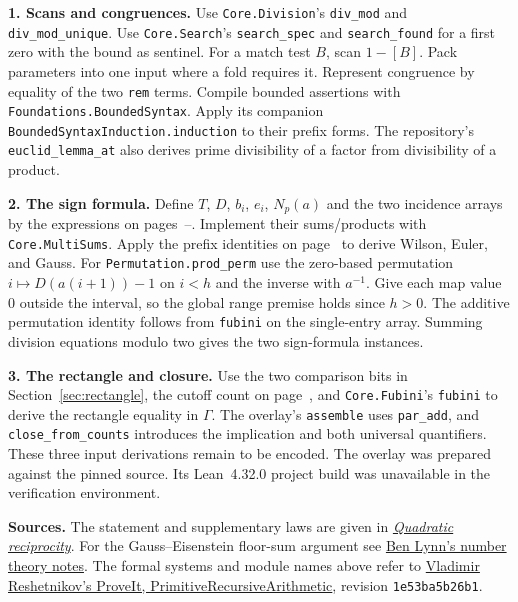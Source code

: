 \documentclass[12pt,letterpaper]{article}
\newcommand{\code}[1]{\texttt{#1}}
\begin{document}
\textbf{1. Scans and congruences.} Use \code{Core.Division}'s \code{div\_mod} and \code{div\_mod\_unique}. Use \code{Core.Search}'s \code{search\_spec} and \code{search\_found} for a first zero with the bound as sentinel. For a match test $B$, scan $1-[B]$. Pack parameters into one input where a fold requires it. Represent congruence by equality of the two \code{rem} terms. Compile bounded assertions with \code{Foundations.BoundedSyntax}. Apply its companion \code{BoundedSyntaxInduction.induction} to their prefix forms. The repository's \code{euclid\_lemma\_at} also derives prime divisibility of a factor from divisibility of a product.

\textbf{2. The sign formula.} Define $T$, $D$, $b_i$, $e_i$, $N_p(a)$ and the two incidence arrays by the expressions on pages~\pageref{sec:euler}--\pageref{sec:gauss}. Implement their sums/products with \code{Core.MultiSums}. Apply the prefix identities on page~\pageref{sec:audit} to derive Wilson, Euler, and Gauss. For \code{Permutation.prod\_perm} use the zero-based permutation $i\mapsto D(a(i+1))-1$ on $i<h$ and the inverse with $a^{-1}$. Give each map value $0$ outside the interval, so the global range premise holds since $h>0$. The additive permutation identity follows from \code{fubini} on the single-entry array. Summing division equations modulo two gives the two sign-formula instances.

\textbf{3. The rectangle and closure.} Use the two comparison bits in Section~\ref{sec:rectangle}, the cutoff count on page~\pageref{sec:audit}, and \code{Core.Fubini}'s \code{fubini} to derive the rectangle equality in $\Gamma$. The overlay's \code{assemble} uses \code{par\_add}, and \code{close\_from\_counts} introduces the implication and both universal quantifiers. These three input derivations remain to be encoded. The overlay was prepared against the pinned source. Its Lean~4.32.0 project build was unavailable in the verification environment.

\medskip\small
\textbf{Sources.} The statement and supplementary laws are given in \href{https://en.wikipedia.org/wiki/Quadratic_reciprocity}{\emph{Quadratic reciprocity}}. For the Gauss--Eisenstein floor-sum argument see \href{https://crypto.stanford.edu/pbc/notes/numbertheory/quadrecip.html}{Ben Lynn's number theory notes}. The formal systems and module names above refer to \href{https://github.com/VladimirReshetnikov/ProveIt/tree/1e53ba5b26b144afb01bf6774d75cf35f6c760b2/Logic/PrimitiveRecursiveArithmetic}{Vladimir Reshetnikov's ProveIt, PrimitiveRecursiveArithmetic}, revision \code{1e53ba5b26b1}.
\end{document}
